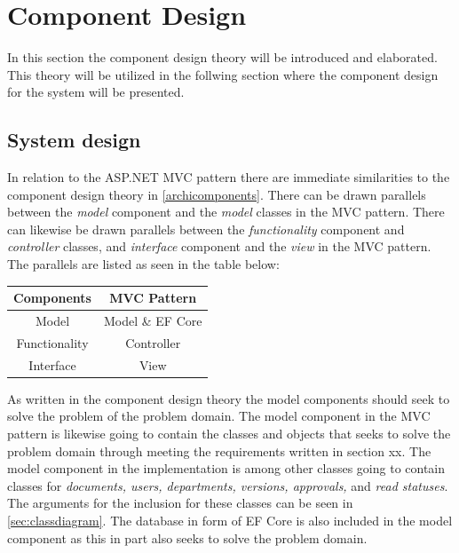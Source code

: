 \section{Component Design} \label{sec:componentdesign}

In this section the component design theory will be introduced and elaborated.
This theory will be utilized in the follwing section where the component design for the system will be presented.



\subsection{System design} \label{sec:systemdesign}

In relation to the ASP.NET MVC pattern there are immediate similarities to the component design theory in \cref{archicomponents}.
There can be drawn parallels between the \textit{model} component and the \textit{model} classes in the MVC pattern.
There can likewise be drawn parallels between the \textit{functionality} component and \textit{controller} classes, and \textit{interface} component and the \textit{view} in the MVC pattern.
The parallels are listed as seen in the table below:

\begin{center}
	\begin{tabular}{| c | c | }
	\hline
	\textbf{Components} & \textbf{MVC Pattern} \\
	\hline
	Model & Model \& EF Core \\
	\hline
	Functionality & Controller \\
	\hline
	Interface & View \\
	\hline
\end{tabular}
\end{center}

As written in the component design theory the model components should seek to solve the problem of the problem domain.
The model component in the MVC pattern is likewise going to contain the classes and objects that seeks to solve the problem domain through meeting the requirements written in section xx.
The model component in the implementation is among other classes going to contain classes for \textit{documents, users, departments, versions, approvals,} and \textit{read statuses}.
The arguments for the inclusion for these classes can be seen in \cref{sec:classdiagram}.
The database in form of EF Core is also included in the model component as this in part also seeks to solve the problem domain.

